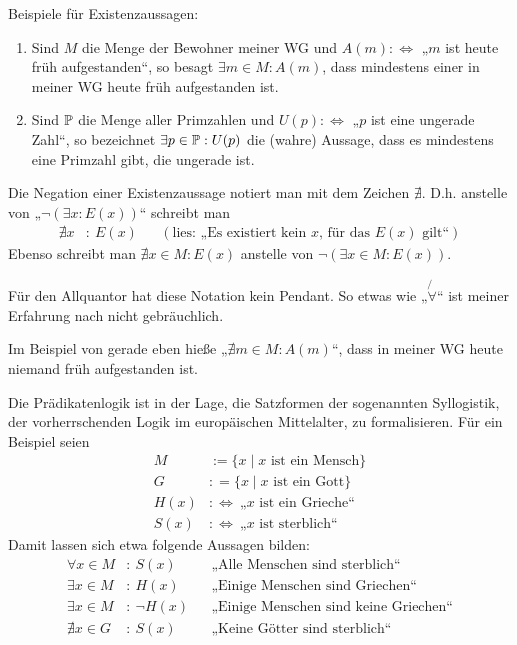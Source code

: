 \begin{bsp}
    Beispiele für Existenzaussagen:
    \begin{enumerate}
        \item Sind $M$ die Menge der Bewohner meiner WG und $A(m):\Leftrightarrow$ „$m$ ist heute früh aufgestanden“, so besagt $\exists m\in M: A(m)$, dass mindestens einer in meiner WG heute früh aufgestanden ist.
        \item Sind $\mathbb P$ die Menge aller Primzahlen und $U(p):\Leftrightarrow$ „$p$ ist eine ungerade Zahl“, so bezeichnet $\exists p\in \mathbb P: U(p)$ die (wahre) Aussage, dass es mindestens eine Primzahl gibt, die ungerade ist.
    \end{enumerate}
\end{bsp}


\begin{nota}
    Die Negation einer Existenzaussage notiert man mit dem Zeichen $\nexists$. D.h. anstelle von „$\neg (\exists x: E(x))$“ schreibt man
    \begin{align*}
        \nexists x &:\ E(x) && (\text{lies: „Es existiert kein $x$, für das $E(x)$ gilt“})
    \end{align*}
    Ebenso schreibt man $\nexists x\in M: E(x)$ anstelle von $\neg (\exists x\in M: E(x))$.
    
    Für den Allquantor hat diese Notation kein Pendant. So etwas wie „$\not{\!\forall}$“ ist meiner Erfahrung nach nicht gebräuchlich.
\end{nota}


\begin{bsp}
    Im Beispiel von gerade eben hieße „$\nexists m\in M: A(m)$“, dass in meiner WG heute niemand früh aufgestanden ist.
\end{bsp}


\begin{bsp}[Syllogistik]
    Die Prädikatenlogik ist in der Lage, die Satzformen der sogenannten Syllogistik, der vorherrschenden Logik im europäischen Mittelalter, zu formalisieren. Für ein Beispiel seien
    \begin{align*}
        M & := \{ x\mid  \text{$x$ ist ein Mensch} \} \\
        G &  : = \{x\mid \text{$x$ ist ein Gott} \} \\
        H(x) & :\Leftrightarrow\ \text{„$x$ ist ein Grieche“} \\
        S(x) & :\Leftrightarrow\ \text{„$x$ ist sterblich“}
    \end{align*}
    Damit lassen sich etwa folgende Aussagen bilden:
    \begin{align*}
        \forall x\in M& :\ S(x) && \text{„Alle Menschen sind sterblich“} \\
        \exists x \in M & :\ H(x)&& \text{„Einige Menschen sind Griechen“} \\
        \exists x \in M& :\ \neg H(x) && \text{„Einige Menschen sind keine Griechen“} \\
        \nexists x\in G & :\ S(x)&& \text{„Keine Götter sind sterblich“}
    \end{align*}
\end{bsp}



